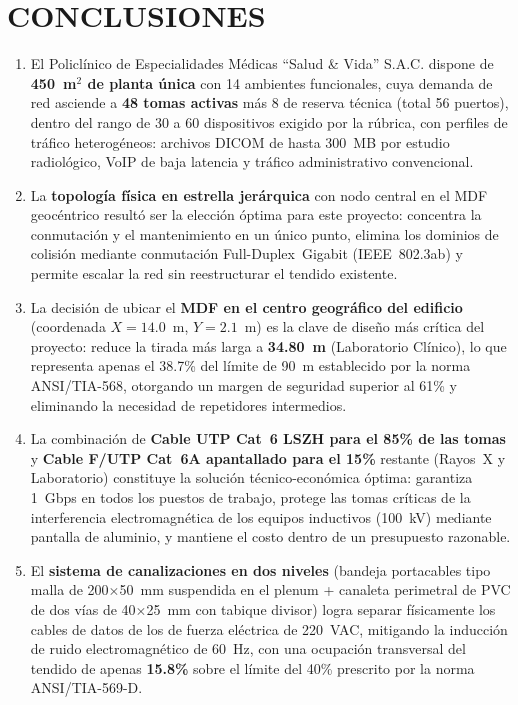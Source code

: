 \chapter*{CONCLUSIONES}

\begin{enumerate}[leftmargin=*, label=\arabic*.]

    \item El Policlínico de Especialidades Médicas ``Salud \& Vida'' S.A.C. dispone de \textbf{450~m$^2$ de planta única} con 14 ambientes funcionales, cuya demanda de red asciende a \textbf{48 tomas activas} más 8 de reserva técnica (total 56 puertos), dentro del rango de 30 a 60 dispositivos exigido por la rúbrica, con perfiles de tráfico heterogéneos: archivos DICOM de hasta 300~MB por estudio radiológico, VoIP de baja latencia y tráfico administrativo convencional.
    
    \item La \textbf{topología física en estrella jerárquica} con nodo central en el MDF geocéntrico resultó ser la elección óptima para este proyecto: concentra la conmutación y el mantenimiento en un único punto, elimina los dominios de colisión mediante conmutación Full-Duplex~Gigabit (IEEE~802.3ab) y permite escalar la red sin reestructurar el tendido existente.
    
    \item La decisión de ubicar el \textbf{MDF en el centro geográfico del edificio} (coordenada $X = 14.0$~m, $Y = 2.1$~m) es la clave de diseño más crítica del proyecto: reduce la tirada más larga a \textbf{34.80~m} (Laboratorio Clínico), lo que representa apenas el 38.7\% del límite de 90~m establecido por la norma ANSI/TIA-568, otorgando un margen de seguridad superior al 61\% y eliminando la necesidad de repetidores intermedios.
    
    \item La combinación de \textbf{Cable UTP Cat~6 LSZH para el 85\% de las tomas} y \textbf{Cable F/UTP Cat~6A apantallado para el 15\%} restante (Rayos~X y Laboratorio) constituye la solución técnico-económica óptima: garantiza 1~Gbps en todos los puestos de trabajo, protege las tomas críticas de la interferencia electromagnética de los equipos inductivos (100~kV) mediante pantalla de aluminio, y mantiene el costo dentro de un presupuesto razonable.
    
    \item El \textbf{sistema de canalizaciones en dos niveles} (bandeja portacables tipo malla de 200$\times$50~mm suspendida en el plenum + canaleta perimetral de PVC de dos vías de 40$\times$25~mm con tabique divisor) logra separar físicamente los cables de datos de los de fuerza eléctrica de 220~VAC, mitigando la inducción de ruido electromagnético de 60~Hz, con una ocupación transversal del tendido de apenas \textbf{15.8\%} sobre el límite del 40\% prescrito por la norma ANSI/TIA-569-D.
    

\end{enumerate}
